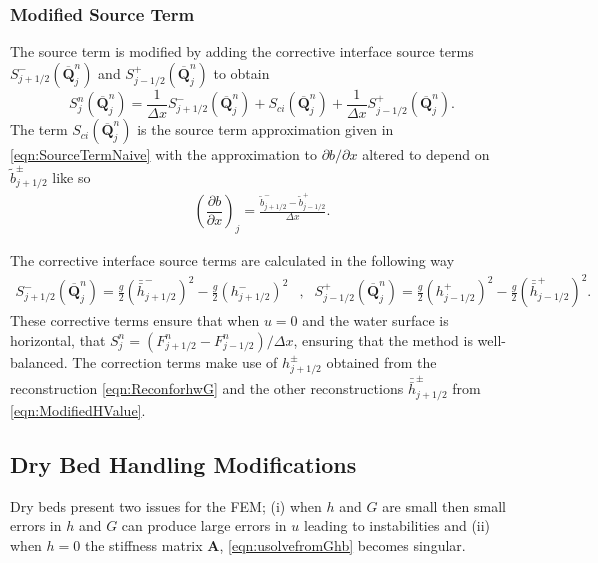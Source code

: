 \documentclass[times]{elsarticle}
\newcommand{\matr}[1]{\mathbf{#1}}
\newcommand{\vecn}[1]{\boldsymbol{#1}}
\begin{document}
\subsubsection{Modified Source Term}
The source term is modified by adding the corrective interface source terms $S^{-}_{j + 1/2}\left(\overline{\vecn{Q} }^{n}_j \right)$ and $S^{+}_{j - 1/2}\left(\overline{\vecn{Q} }^{n}_j \right)$ to obtain
\begin{equation*}
S^n_j\left(\overline{\vecn{Q} }^{n}_j \right)  =  \frac{1}{\Delta x}S^{-}_{j + 1/2}\left(\overline{\vecn{Q} }^{n}_j \right)  +  S_{ci}\left(\overline{\vecn{Q} }^{n}_j \right)  +  \frac{1}{\Delta x}S^{+}_{j - 1/2}\left(\overline{\vecn{Q} }^{n}_j \right) .
\end{equation*}
The term $S_{ci}\left(\overline{\vecn{Q} }^{n}_j \right) $ is the source term approximation given in \eqref{eqn:SourceTermNaive} with the approximation to $\partial b / \partial x$ altered to depend on $\tilde{b}^\pm_{j+1/2}$ like so
\begin{align*}
\left(\dfrac{\partial {b}}{\partial x} \right)_{j} =  \frac{\tilde{b}^-_{j+1/2} - \tilde{b}^+_{j-1/2}}{\Delta x}.
\end{align*}

The corrective interface source terms are calculated in the following way
\begin{align*}
S^{-}_{j + 1/2}\left(\overline{\vecn{Q} }^{n}_j \right)  =  \frac{g}{2} \left(\bar{\bar{h}}^{-}_{j + 1/2} \right)^2 - \frac{g}{2} \left(h^{-}_{j + 1/2} \right)^2&,&
S^{+}_{j - 1/2}\left(\overline{\vecn{Q} }^{n}_j \right)  =  \frac{g}{2} \left(h^{+}_{j - 1/2}\right)^2 - \frac{g}{2}\left(\bar{\bar{h}}^{+}_{j - 1/2}\right)^2 .
\end{align*}
These corrective terms ensure that when $u=0$ and the water surface is horizontal, that $S^n_j = \left(F^n_{j+1/2} - F^n_{j-1/2} \right) / \Delta x$, ensuring that the method is well-balanced. The correction terms make use of $h^{\pm}_{j + 1/2}$ obtained from the reconstruction \eqref{eqn:ReconforhwG} and the other reconstructions $\bar{\bar{h}}^{\pm}_{j + 1/2}$ from \eqref{eqn:ModifiedHValue}. 

\subsection{Dry Bed Handling Modifications}
Dry beds present two issues for the FEM; (i) when $h$ and $G$ are small then small errors in $h$ and $G$ can produce large errors in $u$ leading to instabilities and  (ii) when $h=0$ the stiffness matrix $\matr{A}$, \eqref{eqn:usolvefromGhb} becomes singular.
\end{document}
